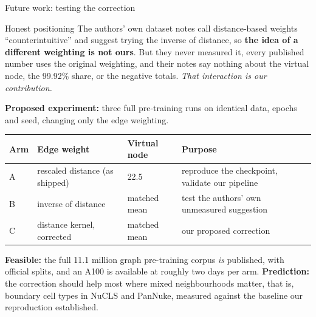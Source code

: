 \documentclass[aspectratio=169,11pt]{beamer}
\begin{document}
\begin{frame}{Future work: testing the correction}

  \begin{block}{Honest positioning}
    \footnotesize The authors' own dataset notes call distance-based weights
    ``counterintuitive'' and suggest trying the inverse of distance, so
    \textbf{the idea of a different weighting is not ours}. But they never
    measured it, every published number uses the original weighting, and their
    notes say nothing about the virtual node, the 99.92\% share, or the negative
    totals. \emph{That interaction is our contribution.}
  \end{block}

  {\small\textbf{Proposed experiment:} three full pre-training runs on identical
  data, epochs and seed, changing only the edge weighting.}

  \begin{center}\scriptsize
  \begin{tabular}{@{}llll@{}}
    \toprule
    \textbf{Arm} & \textbf{Edge weight} & \textbf{Virtual node} & \textbf{Purpose} \\
    \midrule
    A & rescaled distance (as shipped) & 22.5 & reproduce the checkpoint, validate our pipeline \\
    B & inverse of distance & matched mean & test the authors' own unmeasured suggestion \\
    C & distance kernel, corrected & matched mean & our proposed correction \\
    \bottomrule
  \end{tabular}
  \end{center}

  {\scriptsize
  \textbf{Feasible:} the full 11.1 million graph pre-training corpus \emph{is}
  published, with official splits, and an A100 is available at roughly two days
  per arm.
  \textbf{Prediction:} the correction should help most where mixed neighbourhoods
  matter, that is, boundary cell types in NuCLS and PanNuke, measured against the
  baseline our reproduction established.}

\end{frame}
\end{document}
